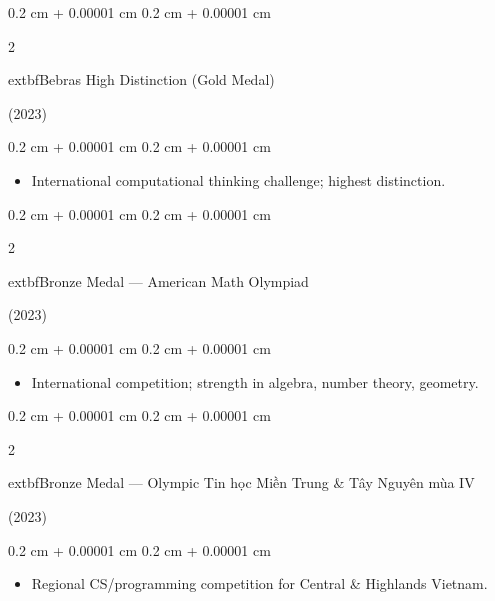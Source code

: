 \documentclass[10pt, letterpaper]{article}
\newenvironment{highlights}{
    \begin{itemize}[
        topsep=0.10 cm,
        parsep=0.10 cm,
        partopsep=0pt,
        itemsep=0pt,
        leftmargin=0.4 cm + 10pt
    ]
}{
    \end{itemize}
} %
\newenvironment{onecolentry}{
    \begin{adjustwidth}{
        0.2 cm + 0.00001 cm
    }{
        0.2 cm + 0.00001 cm
    }
}{
    \end{adjustwidth}
} %
\newenvironment{twocolentry}[2][]{
    \onecolentry
    \def\secondColumn{#2}
    \setcolumnwidth{\fill, 4.5 cm}
    \begin{paracol}{2}
}{
    \switchcolumn \raggedleft \secondColumn
    \end{paracol}
    \endonecolentry
} %
\begin{document}
        \vspace{0.2 cm}

        \begin{twocolentry}{(2023)}
            	extbf{Bebras High Distinction (Gold Medal)}
        \end{twocolentry}

        \vspace{0.10 cm}
        \begin{onecolentry}
            \begin{highlights}
                \item International computational thinking challenge; highest distinction.
            \end{highlights}
        \end{onecolentry}

        \vspace{0.2 cm}

        \begin{twocolentry}{(2023)}
            	extbf{Bronze Medal — American Math Olympiad}
        \end{twocolentry}

        \vspace{0.10 cm}
        \begin{onecolentry}
            \begin{highlights}
                \item International competition; strength in algebra, number theory, geometry.
            \end{highlights}
        \end{onecolentry}

        \vspace{0.2 cm}

        \begin{twocolentry}{(2023)}
            	extbf{Bronze Medal — Olympic Tin học Miền Trung \& Tây Nguyên mùa IV}
        \end{twocolentry}

        \vspace{0.10 cm}
        \begin{onecolentry}
            \begin{highlights}
                \item Regional CS/programming competition for Central \& Highlands Vietnam.
            \end{highlights}
        \end{onecolentry}
\end{document}

